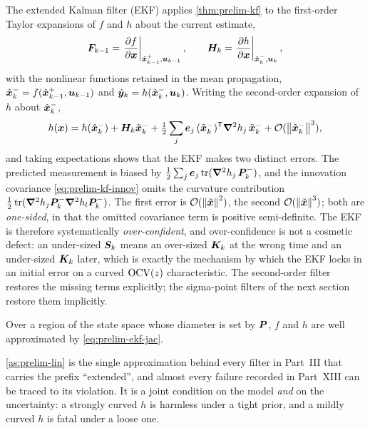 The extended Kalman filter (EKF) applies \cref{thm:prelim-kf} to the first-order Taylor
expansions of $f$ and $h$ about the current estimate,
\begin{equation}
\bm{F}_{k-1} = \left.\frac{\partial f}{\partial\bm{x}}\right|_{\hat{\bm{x}}^{+}_{k-1},\bm{u}_{k-1}},\qquad
\bm{H}_{k}   = \left.\frac{\partial h}{\partial\bm{x}}\right|_{\hat{\bm{x}}^{-}_{k},\bm{u}_{k}} ,
\label{eq:prelim-ekf-jac}
\end{equation}
with the nonlinear functions retained in the mean propagation,
$\hat{\bm{x}}^{-}_k = f(\hat{\bm{x}}^{+}_{k-1},\bm{u}_{k-1})$ and $\hat{\bm{y}}_k = h(\hat{\bm{x}}^{-}_k,\bm{u}_k)$. Writing the second-order
expansion of $h$ about $\hat{\bm{x}}^{-}_k$,
\begin{equation}
h(\bm{x}) = h(\hat{\bm{x}}^{-}_k) + \bm{H}_k\tilde{\bm{x}}^-_k
 + \tfrac12 \sum_{j} \bm{e}_j\,(\tilde{\bm{x}}^-_k)^{\mathsf{T}} \bm{\nabla}^2 h_j\, \tilde{\bm{x}}^-_k
 + \mathcal{O}(\left\lVert \tilde{\bm{x}}^-_k \right\rVert^3),
\label{eq:prelim-ekf-2nd}
\end{equation}
and taking expectations shows that the EKF makes two distinct errors. The predicted measurement
is biased by $\tfrac12\sum_j \bm e_j \operatorname{tr}(\bm\nabla^2 h_j\,\bm{P}^{-}_k)$, and the innovation
covariance \eqref{eq:prelim-kf-innov} omits the curvature contribution
$\tfrac12\operatorname{tr}(\bm\nabla^2 h_j\bm{P}^{-}_k\bm\nabla^2 h_l\bm{P}^{-}_k)$. The first error is
$\mathcal{O}(\left\lVert \tilde{\bm{x}} \right\rVert^2)$, the second $\mathcal{O}(\left\lVert \tilde{\bm{x}} \right\rVert^3)$; both are
\emph{one-sided}, in that the omitted covariance term is positive semi-definite. The EKF is
therefore systematically \emph{over-confident}, and over-confidence is not a cosmetic defect: an
under-sized $\bm{S}_k$ means an over-sized $\bm{K}_k$ at the wrong time and an under-sized $\bm{K}_k$
later, which is exactly the mechanism by which the EKF locks in an initial error on a curved
$\mathrm{OCV}(z)$ characteristic. The second-order filter restores the missing terms explicitly; the
sigma-point filters of the next section restore them implicitly.

\begin{assumption}\label{as:prelim-lin}
Over a region of the state space whose diameter is set by $\bm{P}$, $f$ and $h$ are well
approximated by \eqref{eq:prelim-ekf-jac}.
\end{assumption}

\cref{as:prelim-lin} is the single approximation behind every filter in Part~III that carries the
prefix ``extended'', and almost every failure recorded in Part~XIII can be traced to its
violation. It is a joint condition on the model \emph{and} on the uncertainty: a strongly curved
$h$ is harmless under a tight prior, and a mildly curved $h$ is fatal under a loose one.


